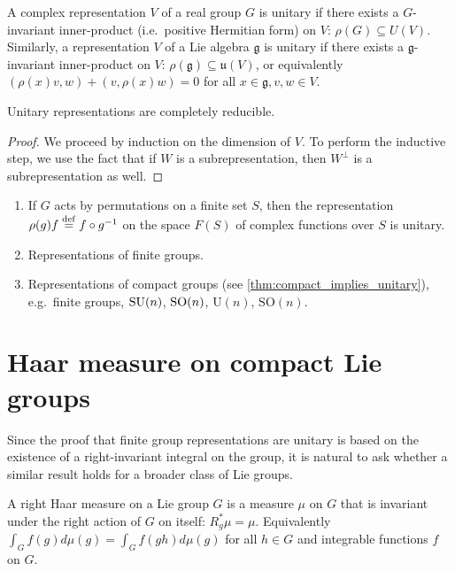 \documentclass{report}
\begin{document}
\begin{definition}
    A complex representation $V$ of a real group $G$ is unitary if there exists a $G$-invariant inner-product (i.e.\ positive Hermitian form) on $V$: $\rho(G) \subseteq U(V)$.
    Similarly, a representation $V$ of a Lie algebra $\mathfrak g$ is unitary if there exists a $\mathfrak g$-invariant inner-product on $V$: $\rho(\mathfrak g) \subseteq \mathfrak u(V)$, or equivalently $(\rho(x)v, w) + (v, \rho(x)w) = 0$ for all $x \in \mathfrak g, v, w \in V$.
\end{definition}

\begin{theorem}\label{thm:unitary_implies_completeley_reducible}
    Unitary representations are completely reducible.
\end{theorem}
\begin{proof}
    We proceed by induction on the dimension of $V$.
    To perform the inductive step, we use the fact that if $W$ is a subrepresentation, then $W^\perp$ is a subrepresentation as well.
\end{proof}
\begin{example}
    \begin{enumerate}[label = (\roman*)]
        \item If $G$ acts by permutations on a finite set $S$, then the representation $\rho(g)f \overset{\mathrm{def}}{=} f \circ g^{-1}$ on the space $F(S)$ of complex functions over $S$ is unitary.
        \item Representations of finite groups.
        \item Representations of compact groups (see \cref{thm:compact_implies_unitary}), e.g.\ finite groups, $\operatorname{{\mathrm{SU}}}(n)$, $\operatorname{{\mathrm{SO}}}(n)$, $\mathrm{U}(n)$, $\mathrm{SO}(n)$.
    \end{enumerate}
\end{example}

\section{Haar measure on compact Lie groups}
Since the proof that finite group representations are unitary is based on the existence of a right-invariant integral on the group, it is natural to ask whether a similar result holds for a broader class of Lie groups.

\begin{definition}
    A right Haar measure on a Lie group $G$ is a measure $\mu$ on $G$ that is invariant under the right action of $G$ on itself: $R_g^* \mu = \mu$.
    Equivalently $\int_G f(g) d\mu(g) = \int_G f(gh) d\mu(g)$ for all $h \in G$ and integrable functions $f$ on $G$.
\end{definition}
\end{document}
